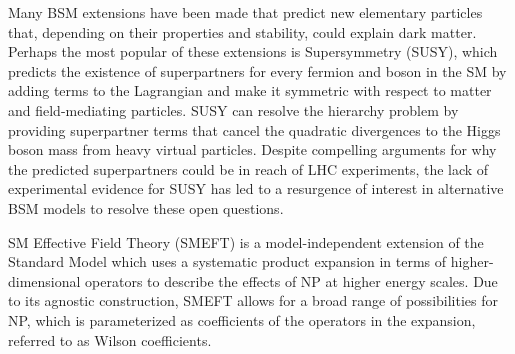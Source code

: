 Many BSM extensions have been made that predict new elementary particles that, depending on their properties and stability, could explain dark matter.
Perhaps the most popular of these extensions is Supersymmetry (SUSY), which predicts the existence of superpartners for every fermion and boson in the SM by adding terms to the Lagrangian and make it symmetric with respect to matter and field-mediating particles.
SUSY can resolve the hierarchy problem by providing superpartner terms that cancel the quadratic divergences to the Higgs boson mass from heavy virtual particles.
Despite compelling arguments for why the predicted superpartners could be in reach of LHC experiments, the lack of experimental evidence for SUSY has led to a resurgence of interest in alternative BSM models to resolve these open questions.

SM Effective Field Theory (SMEFT) is a model-independent extension of the Standard Model which uses a systematic product expansion in terms of higher-dimensional operators to describe the effects of NP at higher energy scales.  
Due to its agnostic construction, SMEFT allows for a broad range of possibilities for NP, which is parameterized as coefficients of the operators in the expansion, referred to as Wilson coefficients.

